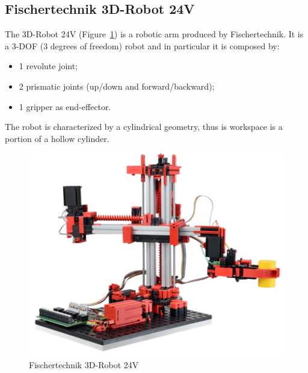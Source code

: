 \documentclass[a4paper,11pt]{report}
\theoremstyle{definition}
\theoremstyle{plain}
\begin{document}
        \subsection{Fischertechnik 3D-Robot 24V}
            The 3D-Robot 24V (Figure~\ref{robot}) is a robotic arm produced by Fischertechnik. It is a 3-DOF (3 degrees of freedom) robot and in particular it is composed by:
            \begin{itemize}
                \item 1 revolute joint;
                \item 2 prismatic joints (up/down and forward/backward);
                \item 1 gripper as end-effector.
            \end{itemize}
            The robot is characterized by a cylindrical geometry, thus is workspace is a portion of a hollow cylinder.
            \begin{figure}[H] %
                \includegraphics[scale=0.38]{images/robot.png}
                \centering
                \caption{Fischertechnik 3D-Robot 24V}
                \label{robot}
            \end{figure}
\end{document}
